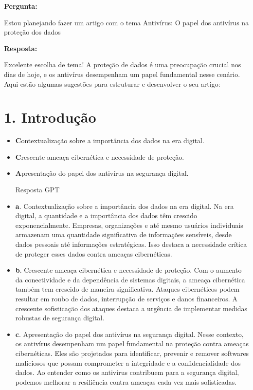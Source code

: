 \documentclass[10pt,conference,twocolumn]{article}
\begin{document}
\textbf{Pergunta:}\newline

Estou planejando fazer um artigo com o tema Antivírus: O papel dos antivírus na proteção dos dados\newline

\textbf{Resposta:}\newline

Excelente escolha de tema! A proteção de dados é uma preocupação crucial nos dias de hoje, e os antivírus desempenham um papel fundamental nesse cenário. Aqui estão algumas sugestões para estruturar e desenvolver o seu artigo:

\section* {1. Introdução}
\begin{itemize}
\item \textbf Contextualização sobre a importância dos dados na era digital.
\item \textbf Crescente ameaça cibernética e necessidade de proteção.
\item \textbf Apresentação do papel dos antivírus na segurança digital.

Resposta GPT

\item \textbf a. Contextualização sobre a importância dos dados na era digital.
Na era digital, a quantidade e a importância dos dados têm crescido exponencialmente. Empresas, organizações e até mesmo usuários individuais armazenam uma quantidade significativa de informações sensíveis, desde dados pessoais até informações estratégicas. Isso destaca a necessidade crítica de proteger esses dados contra ameaças cibernéticas.

\item \textbf b. Crescente ameaça cibernética e necessidade de proteção.
Com o aumento da conectividade e da dependência de sistemas digitais, a ameaça cibernética também tem crescido de maneira significativa. Ataques cibernéticos podem resultar em roubo de dados, interrupção de serviços e danos financeiros. A crescente sofisticação dos ataques destaca a urgência de implementar medidas robustas de segurança digital.

\item \textbf c. Apresentação do papel dos antivírus na segurança digital.
Nesse contexto, os antivírus desempenham um papel fundamental na proteção contra ameaças cibernéticas. Eles são projetados para identificar, prevenir e remover softwares maliciosos que possam comprometer a integridade e a confidencialidade dos dados. Ao entender como os antivírus contribuem para a segurança digital, podemos melhorar a resiliência contra ameaças cada vez mais sofisticadas.


\end{itemize}
\end{document}
